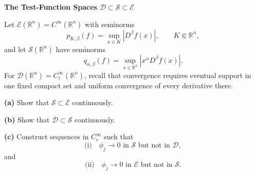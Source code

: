 \begin{problem}[CP-II-0127]
\label{prob:cp-ii-0127}
\textbf{The Test-Function Spaces \(\mathcal D\subset\mathcal S\subset\mathcal E\)}

\hspace*{1.5em}Let \(\mathcal E(\mathbb R^n)=C^\infty(\mathbb R^n)\) with seminorms
\[
p_{K,\beta}(f)=\sup_{x\in K}|D^\beta f(x)|,
\qquad K\Subset\mathbb R^n,
\]
and let \(\mathcal S(\mathbb R^n)\) have seminorms
\[
q_{\alpha,\beta}(f)=\sup_{x\in\mathbb R^n}|x^\alpha D^\beta f(x)|.
\]
For \(\mathcal D(\mathbb R^n)=C_c^\infty(\mathbb R^n)\), recall that
convergence requires eventual support in one fixed compact set and uniform
convergence of every derivative there.

\par\smallskip\noindent\textbf{(a)}\quad
Show that \(\mathcal S\subset\mathcal E\) continuously.

\par\smallskip\noindent\textbf{(b)}\quad
Show that \(\mathcal D\subset\mathcal S\) continuously.

\par\smallskip\noindent\textbf{(c)}\quad
Construct sequences in \(C_c^\infty\) such that
\[
\text{(i)}\quad \phi_j\to0\text{ in }\mathcal S\text{ but not in }\mathcal D,
\]
and
\[
\text{(ii)}\quad \phi_j\to0\text{ in }\mathcal E\text{ but not in }\mathcal S.
\]
\end{problem}

